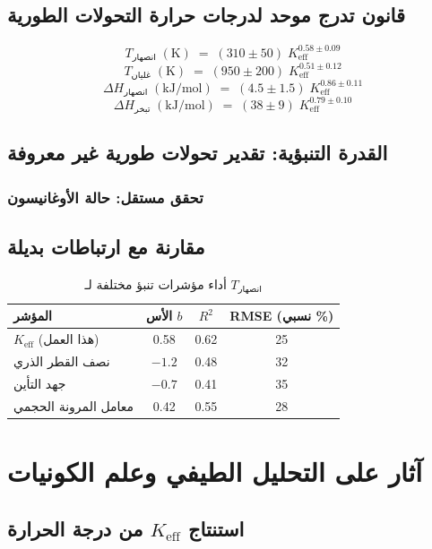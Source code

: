 \documentclass[11pt,a4paper]{article}
\newcommand{\Keff}{K_{\mathrm{eff}}}
\begin{document}
	\subsection{قانون تدرج موحد لدرجات حرارة التحولات الطورية}
	\[
	\boxed{T_{\text{انصهار}} \;(\mathrm{K}) \;=\; (310 \pm 50) \; \Keff^{0.58 \pm 0.09}}
	\]
	\[
	\boxed{T_{\text{غليان}} \;(\mathrm{K}) \;=\; (950 \pm 200) \; \Keff^{0.51 \pm 0.12}}
	\]
	\[
	\boxed{\Delta H_{\text{انصهار}} \;(\mathrm{kJ/mol}) \;=\; (4.5 \pm 1.5) \; \Keff^{0.86 \pm 0.11}}
	\]
	\[
	\boxed{\Delta H_{\text{تبخر}} \;(\mathrm{kJ/mol}) \;=\; (38 \pm 9) \; \Keff^{0.79 \pm 0.10}}
	\]
	
	\subsection{القدرة التنبؤية: تقدير تحولات طورية غير معروفة}
	\subsubsection{تحقق مستقل: حالة الأوغانيسون}
	\subsection{مقارنة مع ارتباطات بديلة}
	
	\begin{table}[htbp]
		\centering
		\caption{أداء مؤشرات تنبؤ مختلفة لـ \(T_{\text{انصهار}}\)}
		\label{tab:comparison}
		\begin{tabular}{@{}lccc@{}}
			\toprule
			\textbf{المؤشر} & \textbf{الأس }\(b\) & \textbf{\(R^2\)} & \textbf{RMSE (نسبي \%)} \\
			\midrule
			\(K_{\mathrm{eff}}\) (هذا العمل) & 0.58 & 0.62 & 25 \\
			نصف القطر الذري & \(-1.2\) & 0.48 & 32 \\
			جهد التأين & \(-0.7\) & 0.41 & 35 \\
			معامل المرونة الحجمي & 0.42 & 0.55 & 28 \\
			\bottomrule
		\end{tabular}
	\end{table}
	
	\section{آثار على التحليل الطيفي وعلم الكونيات}
	\subsection{استنتاج \(\Keff\) من درجة الحرارة}
\end{document}
